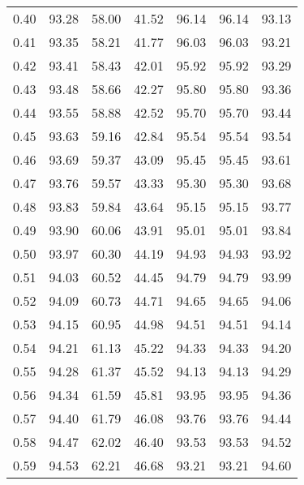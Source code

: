 \begin{tabular}{|c|c|c|c|c|c|c|}
      0.40 &     93.28 &     58.00 &      41.52 &   96.14 &      96.14 &         93.13 \\
      0.41 &     93.35 &     58.21 &      41.77 &   96.03 &      96.03 &         93.21 \\
      0.42 &     93.41 &     58.43 &      42.01 &   95.92 &      95.92 &         93.29 \\
      0.43 &     93.48 &     58.66 &      42.27 &   95.80 &      95.80 &         93.36 \\
      0.44 &     93.55 &     58.88 &      42.52 &   95.70 &      95.70 &         93.44 \\
      0.45 &     93.63 &     59.16 &      42.84 &   95.54 &      95.54 &         93.54 \\
      0.46 &     93.69 &     59.37 &      43.09 &   95.45 &      95.45 &         93.61 \\
      0.47 &     93.76 &     59.57 &      43.33 &   95.30 &      95.30 &         93.68 \\
      0.48 &     93.83 &     59.84 &      43.64 &   95.15 &      95.15 &         93.77 \\
      0.49 &     93.90 &     60.06 &      43.91 &   95.01 &      95.01 &         93.84 \\
      0.50 &     93.97 &     60.30 &      44.19 &   94.93 &      94.93 &         93.92 \\
      0.51 &     94.03 &     60.52 &      44.45 &   94.79 &      94.79 &         93.99 \\
      0.52 &     94.09 &     60.73 &      44.71 &   94.65 &      94.65 &         94.06 \\
      0.53 &     94.15 &     60.95 &      44.98 &   94.51 &      94.51 &         94.14 \\
      0.54 &     94.21 &     61.13 &      45.22 &   94.33 &      94.33 &         94.20 \\
      0.55 &     94.28 &     61.37 &      45.52 &   94.13 &      94.13 &         94.29 \\
      0.56 &     94.34 &     61.59 &      45.81 &   93.95 &      93.95 &         94.36 \\
      0.57 &     94.40 &     61.79 &      46.08 &   93.76 &      93.76 &         94.44 \\
      0.58 &     94.47 &     62.02 &      46.40 &   93.53 &      93.53 &         94.52 \\
      0.59 &     94.53 &     62.21 &      46.68 &   93.21 &      93.21 &         94.60 \\

\end{tabular}
